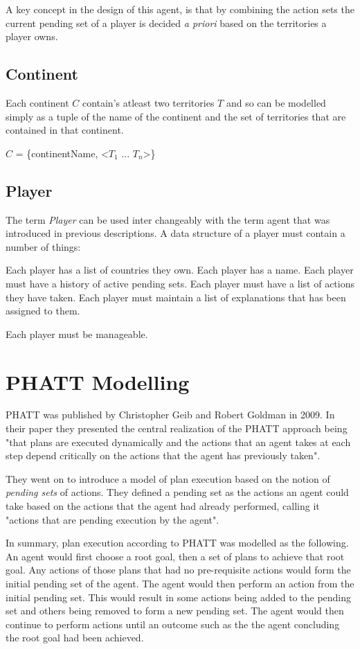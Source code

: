 \documentclass[parskip]{cs4rep}
\begin{document}
A key concept in the design of this agent, is that by combining the action sets the current pending set of a player is decided \textit{a priori} based on the territories a player owns.

\subsection{Continent}

Each continent $C$ contain's atleast two territories $T$ and so can be modelled simply as a tuple of the name of the continent and the set of territories that are contained in that continent.

$C$ = \{continentName, <$T_{1}$ ... $T_{n}$>\}

\subsection{Player}

The term \textit{Player} can be used inter changeably with the term agent that was introduced in previous descriptions. A data structure of a player must contain a number of things:

Each player has a list of countries they own.
Each player has a name.
Each player must have a history of active pending sets.
Each player must have a list of actions they have taken.
Each player must maintain a list of explanations that has been assigned to them.

Each player must be manageable.

\section{PHATT Modelling}

PHATT was published by Christopher Geib and Robert Goldman in 2009. In their paper they presented the central realization of the PHATT approach being "that plans are executed dynamically and the actions that an agent takes at each step depend critically on the actions that the agent has previously taken". 

They went on to introduce a model of plan execution based on the notion of \textit{pending sets} of actions. They defined a pending set as the actions an agent could take based on the actions that the agent had already performed, calling it "actions that are pending execution by the agent".

In summary, plan execution according to PHATT was modelled as the following. An agent would first choose a root goal, then a set of plans to achieve that root goal. Any actions of those plans that had no pre-requisite actions would form the initial pending set of the agent. The agent would then perform an action from the initial pending set. This would result in some actions being added to the pending set and others being removed to form a new pending set. The agent would then continue to perform actions until an outcome such as the the agent concluding the root goal had been achieved.
\end{document}
